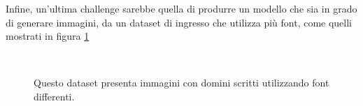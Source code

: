 Infine, un'ultima challenge sarebbe quella di produrre un modello che sia in grado di generare immagini, da un dataset di ingresso che utilizza più font, come quelli mostrati in figura \ref{fig:out4}
\begin{figure}[!h]
  \centering
  \begin{minipage}[b]{0.5\textwidth}
    \label{}
  \end{minipage}
  \begin{minipage}[b]{0.5\textwidth}
    \label{}
  \end{minipage}\\
  \begin{minipage}[b]{0.5\textwidth}
    \label{}
  \end{minipage}
  \begin{minipage}[b]{0.5\textwidth}
    \caption{Questo dataset presenta immagini con domini scritti utilizzando font differenti.}
    \label{fig:out4}
  \end{minipage}
\end{figure}
